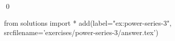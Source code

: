 \begin{ex}
  \label{ex:power-series-3}
  
  \qed
\end{ex}
\begin{python0}
from solutions import *
add(label="ex:power-series-3",
    srcfilename='exercises/power-series-3/answer.tex') 
\end{python0}                              
